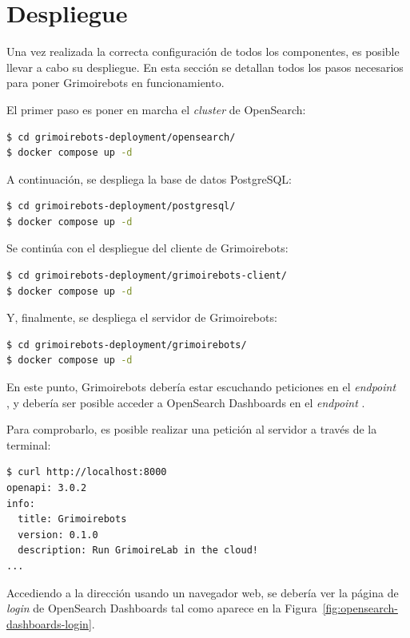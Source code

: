 \section{Despliegue}

Una vez realizada la correcta configuración de todos los componentes, es posible llevar a cabo su despliegue. En esta sección se detallan todos los pasos necesarios para poner Grimoirebots en funcionamiento.

El primer paso es poner en marcha el \emph{cluster} de OpenSearch\index{}:

\begin{lstlisting}[language=bash]
$ cd grimoirebots-deployment/opensearch/
$ docker compose up -d
\end{lstlisting}

A continuación, se despliega la base de datos PostgreSQL\index{}:

\begin{lstlisting}[language=bash]
$ cd grimoirebots-deployment/postgresql/
$ docker compose up -d
\end{lstlisting}

Se continúa con el despliegue del cliente de Grimoirebots:

\begin{lstlisting}[language=bash]
$ cd grimoirebots-deployment/grimoirebots-client/
$ docker compose up -d
\end{lstlisting}

Y, finalmente, se despliega el servidor de Grimoirebots:

\begin{lstlisting}[language=bash]
$ cd grimoirebots-deployment/grimoirebots/
$ docker compose up -d
\end{lstlisting}

En este punto, Grimoirebots debería estar escuchando peticiones en el \emph{endpoint}\\, y debería ser posible acceder a OpenSearch Dashboards en el \emph{endpoint} .

Para comprobarlo, es posible realizar una petición al servidor a través de la terminal:

\begin{lstlisting}[language=bash]
$ curl http://localhost:8000
openapi: 3.0.2
info:
  title: Grimoirebots
  version: 0.1.0
  description: Run GrimoireLab in the cloud!
...
\end{lstlisting}

Accediendo a la dirección  usando un navegador web, se debería ver la página de \emph{login} de OpenSearch Dashboards tal como aparece en la Figura~\ref{fig:opensearch-dashboards-login}.

